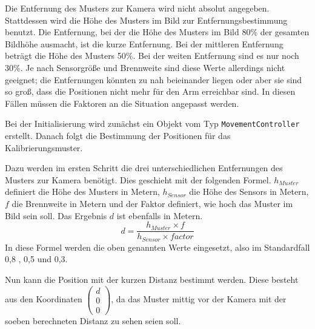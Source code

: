 Die Entfernung des Musters zur Kamera wird nicht absolut angegeben. Stattdessen wird die Höhe des Musters im Bild zur Entfernungsbestimmung benutzt. Die Entfernung, bei der die Höhe des Musters im Bild 80\% der gesamten Bildhöhe ausmacht, ist die kurze Entfernung. Bei der mittleren Entfernung beträgt die Höhe des Musters 50\%. Bei der weiten Entfernung sind es nur noch 30\%. Je nach Sensorgröße und Brennweite sind diese Werte allerdings nicht geeignet; die Entfernungen könnten zu nah beieinander liegen oder aber sie sind so groß, dass die Positionen nicht mehr für den Arm erreichbar sind. In diesen Fällen müssen die Faktoren an die Situation angepasst werden.

Bei der Initialisierung wird zunächst ein Objekt vom Typ \texttt{MovementController} erstellt. Danach folgt die Bestimmung der Positionen für das Kalibrierungsmuster.

Dazu werden im ersten Schritt die drei unterschiedlichen Entfernungen des Musters zur Kamera benötigt. Dies geschieht mit der folgenden Formel. $h_{Muster}$ definiert die Höhe des Musters in Metern, $h_{Sensor}$ die Höhe des Sensors in Metern, $f$ die Brennweite in Metern und der Faktor definiert, wie hoch das Muster im Bild sein soll. Das Ergebnis $d$ ist ebenfalls in Metern.
\begin{equation}
	d = \frac{h_{Muster} \times f }{h_{Sensor} \times factor}
\end{equation}
In diese Formel werden die oben genannten Werte eingesetzt, also im Standardfall 0,8 , 0,5 und 0,3.

Nun kann die Position mit der kurzen Distanz bestimmt werden. Diese besteht aus den Koordinaten $\begin{pmatrix}
	d\\ 0\\ 0
\end{pmatrix}$, da das Muster mittig vor der Kamera mit der soeben berechneten Distanz zu sehen seien soll.

